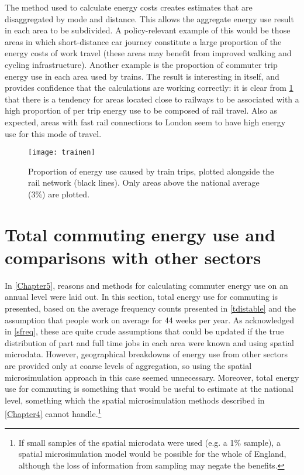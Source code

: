 The method used to calculate energy costs creates estimates
that are disaggregated by mode and distance. This allows the
aggregate energy use result in each area to be subdivided.
A policy-relevant example of this would be those areas in which
short-distance car journey constitute
a large proportion of the energy costs of work travel (these areas
may benefit from improved walking and cycling infrastructure). Another example
is the proportion of commuter trip energy use
in each area used by trains. The result is interesting in itself, and
provides confidence that the calculations are working correctly:
it is clear from \cref{ftrainen} that there is a tendency for
areas located close to railways
to be associated with a high proportion of per trip energy
use to be composed of rail travel. Also as expected, areas with fast rail
connections to London seem to have high energy use for this mode of travel.

\begin{figure}[htbp]
\begin{center}
    \texttt{[image: trainen]}  \end{center}
  \caption[Proportion of energy use caused by train trips]
  {Proportion of energy use caused by train trips, plotted alongside the rail
network (black lines). Only areas above the national average (3\%) are
plotted.}
 \label{ftrainen}
\end{figure}

\section{Total commuting energy use and comparisons with other sectors}
\label{stotalcomp}
In \cref{Chapter5}, reasons and methods for calculating commuter energy use
on an annual level were laid out. In this section, total energy use
for commuting is presented, based on the average frequency counts presented
in \cref{tdistable} and the assumption that people work on average for
44 weeks per year. As acknowledged in \cref{sfreq}, these are quite crude
assumptions that could be updated if the true distribution of part and
full time jobs in each area were known and using spatial microdata.
However, geographical breakdowns of energy use from other sectors are
provided only at coarse levels of aggregation, so using the spatial
microsimulation approach in this case seemed unnecessary. Moreover, total
energy use for commuting is something that would be useful to estimate at
the national level, something which the spatial microsimulation methods
described in \cref{Chapter4} cannot
handle.\footnote{If small samples of the
spatial microdata were used (e.g. a 1\% sample), a spatial microsimulation
model would be possible for the whole of England, although the loss of
information from sampling may negate the benefits.
}

